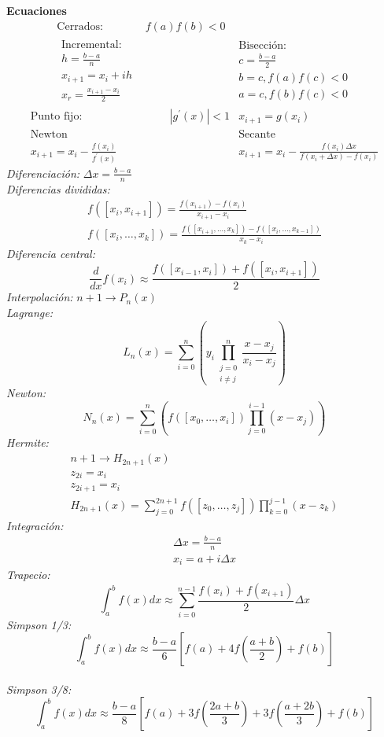 \documentclass[12pt]{article}
\begin{document}
  \clearpage
  \textbf{Ecuaciones}
\begin{align*}
  \text{Cerrados: } & f(a)f(b)<0 &  \\
  \begin{array}{c}
  \text{Incremental:}\\
  h = \frac{b-a}{n} \\
  x_{i+1} = x_i + ih\\
  x_r = \frac{x_{i+1}-x_i}{2}
  \end{array}
  & \qquad \qquad &
  \begin{array}{c}
  \text{Bisección:}\\
  c = \frac{b-a}{2}\\
  b = c, f(a)f(c)<0\\
  a = c, f(b)f(c)<0
  \end{array}
\end{align*}
\begin{align*}
  \text{Punto fijo:}& \qquad \qquad |g^\prime (x)| < 1 & x_{i+1} = g(x_i) \\
  \text{Newton} & & \text{Secante} \\
  x_{i+1} = x_i - \frac{f(x_i)}{f^\prime(x)} & \qquad \qquad &
    x_{i+1} = x_i - \frac{f(x_i)\Delta x}{f(x_i+\Delta x)-f(x_i)}
\end{align*}
  \textit{Diferenciación:} $ \Delta x = \frac{b-a}{n}$\\
  \textit{Diferencias divididas:}
  \begin{eqnarray*}
  f([x_i, x_{i+1}]) = \frac{f(x_{i+1})-f(x_i)}{x_{i+1}-x_i}\\
  f([x_i, \ldots, x_k]) = \frac{f([x_{i+1}, \ldots, x_k]) - f([x_i, \ldots, x_{k-1}])}{x_k - x_i}
  \end{eqnarray*}
  \textit{Diferencia central:} $$\frac{d}{dx}f(x_i) \approx \frac{f([x_{i-1}, x_i])+f([x_{i}, x_{i+1}])}{2} $$
  \textit{Interpolación:} $n+1 \rightarrow P_n(x)$\\
  \textit{Lagrange:} $$L_n(x) = \sum_{i=0}^n \left(y_i\prod_{\substack{j=0 \\ i \neq j}}^n \frac{x-x_j}{x_i - x_j}\right)$$
  \textit{Newton:} $$N_n(x) = \sum_{i=0}^n \left(f([x_0, \ldots, x_i]) \prod_{j=0}^{i-1}(x-x_j)\right)$$
  \textit{Hermite:}
  \begin{eqnarray*}
  n+1 \rightarrow H_{2n+1}(x)\\
  z_{2i} = x_i\\
  z_{2i+1} = x_i\\
  H_{2n+1}(x) = \sum_{j=0}^{2n+1}f([z_0, \ldots, z_j])\prod_{k=0}^{j-1}(x - z_k)
  \end{eqnarray*}
  \textit{Integración:}
  \begin{eqnarray*}
   \Delta x = \frac{b-a}{n}\\
   x_i = a + i \Delta x
  \end{eqnarray*}
  \textit{Trapecio:}
  $$\int_a^b f(x)dx \approx \sum_{i=0}^{n-1} \frac{f(x_i) + f(x_{i+1})}{2}\Delta x$$
  \textit{Simpson 1/3:}
  $$ \int_a^b f(x)dx \approx \frac{b-a}{6} \left[f(a) + 4f\left(\frac{a+b}{2} \right) + f(b) \right] $$\\
  \textit{Simpson 3/8:}
  $$ \int_a^b f(x)dx \approx \frac{b-a}{8} \left[f(a) + 3f\left(\frac{2a+b}{3}\right) + 3f\left(\frac{a+2b}{3}\right) + f(b) \right] $$
\end{document}
